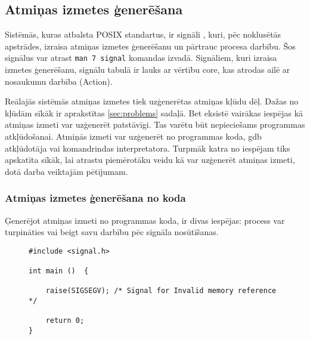  \subsection{Atmiņas izmetes ģenerēšana}
Sistēmās, kuras atbalsta POSIX standartus, ir signāli \cite{USP}, kuri, pēc noklusētās apstrādes, izraisa atmiņas izmetes ģenerēšanu un pārtrauc procesa darbību. 
Šos signālus var atrast  \texttt{man 7 signal} komandas izvadā. 
Signāliem, kuri izraisa izmetes ģenerēšanu, signālu tabulā \cite{signal} ir lauks ar vērtību core, kas atrodas ailē ar nosaukumu darbība (Action). 


Reālajās sistēmās atmiņas izmetes tiek uzģenerētas atmiņas kļūdu dēļ. 
Dažas no kļūdām sīkāk ir aprakstītas \ref{sec:problems} sadaļā. 
Bet eksistē vairākas iespējas kā atmiņas izmeti var uzģenerēt patstāvīgi.
Tas varētu būt nepieciešams programmas atkļūdošanai.
Atmiņās izmeti var uzģenerēt no programmas koda,  gdb atkļūdotāja vai komandrindas interpretatora.
Turpmāk katra no iespējam tiks apskatīta sīkāk, lai atrastu piemērotāku veidu kā var uzģenerēt atmiņas izmeti, dotā darba veiktajām pētījumam.

\subsubsection{Atmiņas izmetes ģenerēšana no koda}

Ģenerējot atmiņas izmeti no programmas koda, ir divas iespējas: process var turpināties vai beigt savu darbību pēc signāla nosūtīšanas.

\begin{figure}[h]
\begin{lstlisting}
#include <signal.h>

int main ()  {

    raise(SIGSEGV); /* Signal for Invalid memory reference */
	
    return 0;
}
\end{lstlisting}
\caption{\textbf{\fontsize{11}{12}\selectfont {Atmiņas izmetes ģenerēšana, pārtraucot procesa darbību}}}
\end{figure}

